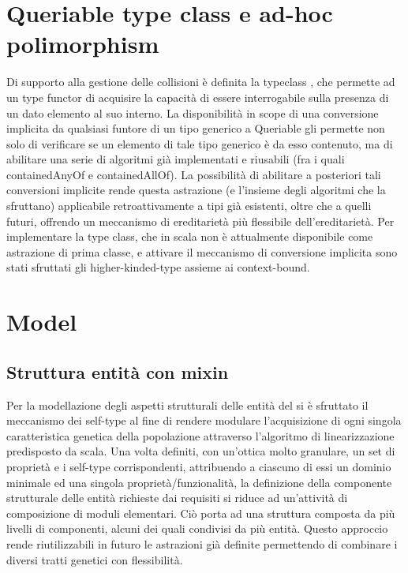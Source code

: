 \section{Queriable type class e ad-hoc polimorphism}
Di supporto alla gestione delle collisioni è definita la typeclass , che permette ad un type functor di acquisire la capacità di essere interrogabile sulla presenza di un dato elemento al suo interno. La disponibilità in scope di una conversione implicita da qualsiasi funtore di un tipo generico a Queriable gli permette non solo di verificare se un elemento di tale tipo generico è da esso contenuto, ma di abilitare una serie di algoritmi già implementati e riusabili (fra i quali containedAnyOf e containedAllOf). La possibilità di abilitare a posteriori tali conversioni implicite rende questa astrazione (e l’insieme degli algoritmi che la sfruttano) applicabile retroattivamente a tipi già esistenti, oltre che a quelli futuri, offrendo un meccanismo di ereditarietà più flessibile dell’ereditarietà. Per implementare la type class, che in scala non è attualmente disponibile come astrazione di prima classe, e attivare il meccanismo di conversione implicita sono stati sfruttati gli higher-kinded-type assieme ai context-bound.

\section{Model}

\subsection{Struttura entità con mixin}
Per la modellazione degli aspetti strutturali delle entità del  si è sfruttato il meccanismo dei self-type al fine di rendere modulare l’acquisizione di ogni singola caratteristica genetica della popolazione attraverso l’algoritmo di linearizzazione predisposto da scala. Una volta definiti, con un’ottica molto granulare, un set di proprietà e i self-type corrispondenti, attribuendo a ciascuno di essi un dominio minimale ed una singola proprietà/funzionalità, la definizione della componente strutturale delle entità richieste dai requisiti si riduce ad un’attività di composizione di moduli elementari. Ciò porta ad una struttura composta da più livelli di componenti, alcuni dei quali condivisi da più entità. Questo approccio rende riutilizzabili in futuro le astrazioni già definite permettendo di combinare i diversi tratti genetici con flessibilità.

